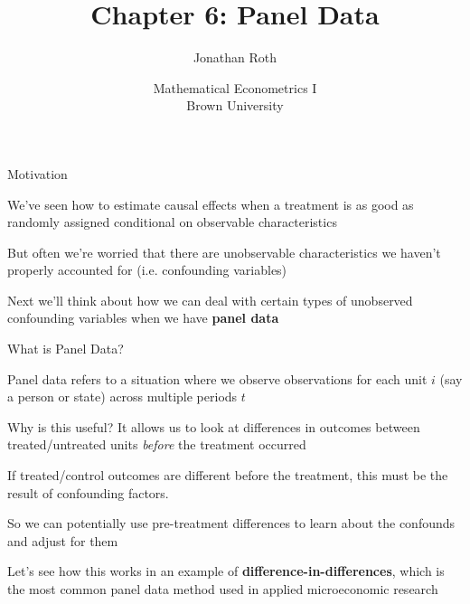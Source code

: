\documentclass[11pt,english,handout]{beamer}
\newenvironment{wideitemize}{\itemize\addtolength{\itemsep}{10pt}}{\enditemize}
\begin{document}
	
	\begin{frame}[noframenumbering]{}
		\vspace{0.5cm}
		\title[]{Chapter 6: Panel Data}
		\author{Jonathan Roth}
		\date{Mathematical Econometrics I \\ Brown University\\ } 
		\titlepage {\small{}\ }\thispagestyle{empty} \vspace{-30pt}
		
	\end{frame}

	
	\begin{frame}{Motivation}
		
		\begin{wideitemize}
			\item
			We've seen how to estimate causal effects when a treatment is as good as randomly assigned conditional on observable characteristics
			
			\item
			But often we're worried that there are unobservable characteristics we haven't properly accounted for (i.e. confounding variables)
			
			\pause
			\item
			Next we'll think about how we can deal with certain types of unobserved confounding variables when we have \textbf{panel data}

			
		\end{wideitemize}

	\end{frame}

\begin{frame}{What is Panel Data?}
	\begin{wideitemize}
	\item
	Panel data refers to a situation where we observe observations for each unit $i$ (say a person or state) across multiple periods $t$				
	
	\pause
	\item
	Why is this useful? It allows us to look at differences in outcomes between treated/untreated units \textit{before} the treatment occurred
	
	\pause
	\item
	If treated/control outcomes are different before the treatment, this must be the result of confounding factors.
	
	\pause
	\item
	So we can potentially use pre-treatment differences to learn about the confounds and adjust for them
	
	\pause
	\item
	Let's see how this works in an example of \textbf{difference-in-differences}, which is the most common panel data method used in applied microeconomic research
	\end{wideitemize}

\end{frame}	
\end{document}

